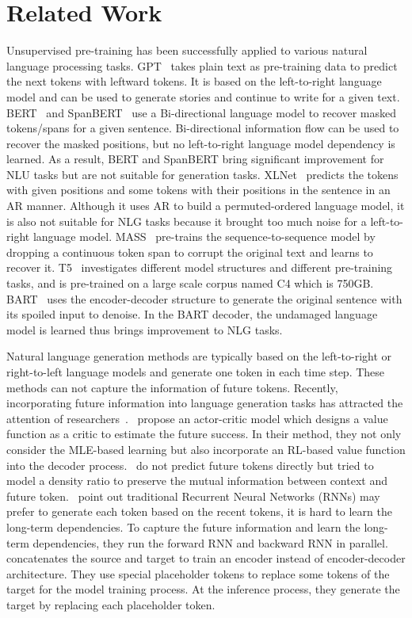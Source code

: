 \documentclass[11pt,a4paper]{article}
\begin{document}
\section{Related Work}
Unsupervised pre-training has been successfully applied to various natural language processing tasks. 
GPT~\cite{radford2018improving} takes plain text as pre-training data to predict the next tokens with leftward tokens. It is based on the left-to-right language model and can be used to generate stories and continue to write for a given text. 
BERT~\cite{devlin2018bert} and SpanBERT~\cite{joshi2019spanbert} use a Bi-directional language model to recover masked tokens/spans for a given sentence. Bi-directional information flow can be used to recover the masked positions, but no left-to-right language model dependency is learned. As a result, BERT and SpanBERT bring significant improvement for NLU tasks but are not suitable for generation tasks. XLNet~\cite{yang2019xlnet} predicts the tokens with given positions and some tokens with their positions in the sentence in an AR manner. Although it uses AR to build a permuted-ordered language model, it is also not suitable for NLG tasks because it brought too much noise for a left-to-right language model. 
MASS~\cite{song2019mass} pre-trains the sequence-to-sequence model by dropping a continuous token span to corrupt the original text and learns to recover it. 
T5~\cite{raffel2019exploring} investigates different model structures and different pre-training tasks, and is pre-trained on a large scale corpus named C4 which is 750GB.
BART~\cite{lewis2019bart} uses the encoder-decoder structure to generate the original sentence with its spoiled input to denoise. In the BART decoder, the undamaged language model is learned thus brings improvement to NLG tasks. 

Natural language generation methods are typically based on the left-to-right or right-to-left language models and generate one token in each time step. These methods can not capture the information of future tokens. Recently, incorporating future information into language generation tasks has attracted the attention of researchers~\cite{li2017learning,serdyuk2017twin,lawrence2019attending,oord2018representation}.~\citet{li2017learning} propose an actor-critic model which designs a value function as a critic to estimate the future success. In their method, they not only consider the MLE-based learning but also incorporate an RL-based value function into the decoder process.~\cite{oord2018representation} do not predict future tokens directly but tried to model a density ratio to preserve the mutual information between context and future token.~\citet{serdyuk2017twin} point out traditional Recurrent Neural Networks (RNNs) may prefer to generate each token based on the recent tokens, it is hard to learn the long-term dependencies. To capture the future information and learn the long-term dependencies, they run the forward RNN and backward RNN in parallel.~\citet{lawrence2019attending} concatenates the source and target to train an encoder instead of encoder-decoder architecture. They use special placeholder tokens to replace some tokens of the target for the model training process. At the inference process, they generate the target by replacing each placeholder token.
\end{document}
